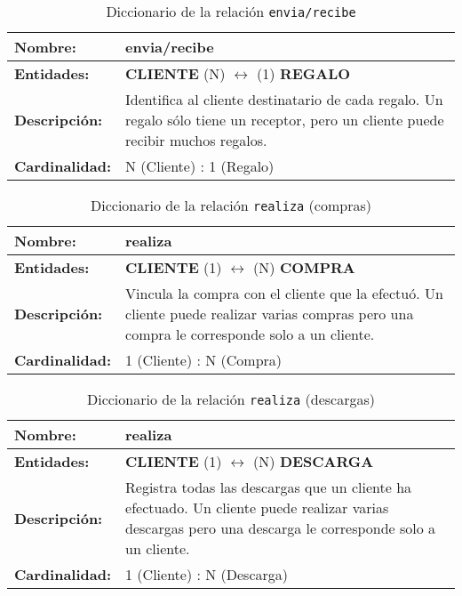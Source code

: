 \begin{longtable}{|p{3.5cm}|p{10cm}|}
\caption{Diccionario de la relación \texttt{envia/recibe}}
\label{tab:rel_envia_recibe} \\ \hline
\textbf{Nombre:} & envia/recibe \\ \hline
\textbf{Entidades:} & \textbf{CLIENTE} (N) $\longleftrightarrow$ (1) \textbf{REGALO} \\ \hline
\textbf{Descripción:} & Identifica al cliente destinatario de cada regalo.  
Un regalo sólo tiene un receptor, pero un cliente puede recibir muchos regalos. \\ \hline
\textbf{Cardinalidad:} & N (Cliente) : 1 (Regalo) \\ \hline
\end{longtable}

\begin{longtable}{|p{3.5cm}|p{10cm}|}
\caption{Diccionario de la relación \texttt{realiza} (compras)}
\label{tab:rel_realiza_compra} \\ \hline
\textbf{Nombre:} & realiza \\ \hline
\textbf{Entidades:} & \textbf{CLIENTE} (1) $\longleftrightarrow$ (N) \textbf{COMPRA} \\ \hline
\textbf{Descripción:} & Vincula la compra con el cliente que la efectuó. Un cliente puede realizar varias compras pero una compra le corresponde solo a un cliente. \\ \hline
\textbf{Cardinalidad:} & 1 (Cliente) : N (Compra) \\ \hline
\end{longtable}

\begin{longtable}{|p{3.5cm}|p{10cm}|}
\caption{Diccionario de la relación \texttt{realiza} (descargas)}
\label{tab:rel_realiza_descarga} \\ \hline
\textbf{Nombre:} & realiza \\ \hline
\textbf{Entidades:} & \textbf{CLIENTE} (1) $\longleftrightarrow$ (N) \textbf{DESCARGA} \\ \hline
\textbf{Descripción:} & Registra todas las descargas que un cliente ha efectuado. Un cliente puede realizar varias descargas pero una descarga le corresponde solo a un cliente. \\ \hline
\textbf{Cardinalidad:} & 1 (Cliente) : N (Descarga) \\ \hline
\end{longtable}


